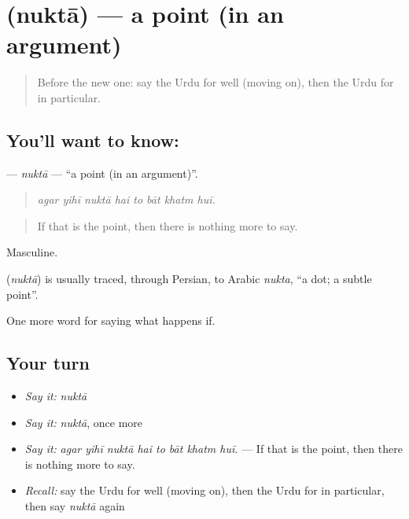 \section[\texorpdfstring{\ur{نکتہ} (nuktā)}{نکتہ (nuktā)}]{ (nuktā) — a point (in an argument)}

\label{lesson:UR-C542-nukta}



\begin{quote}
Before the new one: say the Urdu for well (moving on), then the Urdu for in particular.
\end{quote}

\subsection*{You'll want to know: }
\textbf{} — \emph{nuktā} — \textquotedblleft{}a point (in an argument)\textquotedblright{}.

\begin{quote}
       
\end{quote}

\begin{quote}
\emph{agar yihī nuktā hai to bāt khatm huī.}
\end{quote}

\begin{quote}
If that is the point, then there is nothing more to say.
\end{quote}

Masculine.

\begin{cousinweb}
\textbf{} (\emph{nuktā}) is usually traced, through Persian, to Arabic \emph{nukta}, \textquotedblleft{}a dot; a subtle point\textquotedblright{}.
\end{cousinweb}

\begin{grammarlens}[title={What you've built}]
One more word for saying what happens if.
\end{grammarlens}

\subsection*{Your turn}
\begin{itemize}
\raggedright
  \item \emph{Say it:} \emph{nuktā}
  \item \emph{Say it:} \emph{nuktā}, once more
  \item \emph{Say it:} \emph{agar yihī nuktā hai to bāt khatm huī.} — If that is the point, then there is nothing more to say.
  \item \emph{Recall:} say the Urdu for well (moving on), then the Urdu for in particular, then say \emph{nuktā} again
\end{itemize}

